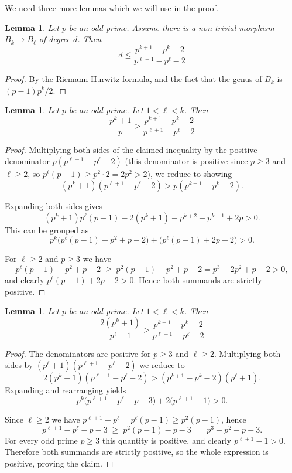 \documentclass[oneside,a4paper,12pt]{article}
\theoremstyle{plain} %
\newtheorem{lemma}[theorem]{Lemma}
\theoremstyle{definition} %
\begin{document}
We need three more lemmas which we will use in the proof.


\begin{lemma}\label{rh_ineq}
Let $p$ be an odd prime. Assume there is a 
 non-trivial morphism  $B_{k} \longrightarrow B_{\ell}$ of degree $d$.
Then 
$$ d\leq \frac{p^{k+1}-p^k-2}{ p^{\ell+1}-p^\ell-2} $$
\end{lemma}

\begin{proof}
By the Riemann-Hurwitz formula, and the fact that the genus
of $B_k$ is $(p-1)p^k/2$.
\end{proof}


\begin{lemma}\label{kl_ineq}
Let $p$ be an odd prime. Let $1<\ell <k$.
Then 
$$\frac{p^k+1}{p} > \frac{p^{k+1}-p^k-2}{ p^{\ell+1}-p^\ell-2} $$
\end{lemma}

\begin{proof}
Multiplying both sides of the claimed inequality by the positive denominator 
\(p(p^{\ell+1}-p^\ell-2)\) (this denominator is positive since \(p\ge 3\) and \(\ell\ge 2\), 
so \(p^\ell(p-1)\ge p^2\cdot 2 = 2p^2 > 2\)), we reduce to showing
\[
(p^k+1)(p^{\ell+1}-p^\ell-2) > p(p^{k+1}-p^k-2).
\]

Expanding both sides gives
\[
(p^k+1)p^\ell(p-1)-2(p^k+1) - p^{k+2}+p^{k+1}+2p>0.
\]
This can be grouped as
\[
p^k\big(p^\ell(p-1)-p^2+p-2\big) + \big(p^\ell(p-1)+2p-2\big)>0.
\]

For \(\ell\ge 2\) and \(p\ge 3\) we have
\[
p^\ell(p-1)-p^2+p-2 \;\ge\; p^2(p-1)-p^2+p-2 = p^3-2 p^2+p-2 >0,
\]
and clearly \(p^\ell(p-1)+2p-2 >0\). Hence both summands are strictly positive.
\end{proof}



\begin{lemma}\label{kl_ineq_2}
Let $p$ be an odd prime. Let $1<\ell <k$.
Then 
$$\frac{2(p^k+1)}{p^\ell+1} > \frac{p^{k+1}-p^k-2}{ p^{\ell+1}-p^\ell-2} $$
\end{lemma}

\begin{proof}
The denominators are positive for \(p\ge3\) and \(\ell\ge2\). Multiplying both sides by 
\((p^\ell+1)(p^{\ell+1}-p^\ell-2)\) we reduce to
\[
2(p^k+1)(p^{\ell+1}-p^\ell-2)>(p^{k+1}-p^k-2)(p^\ell+1).
\]
Expanding and rearranging yields
\[
p^k\big(p^{\ell+1}-p^\ell-p-3\big)+2\big(p^{\ell+1}-1\big)>0.
\]




Since \(\ell\ge2\) we have \(p^{\ell+1}-p^\ell=p^\ell(p-1)\ge p^2(p-1)\), hence
\[
p^{\ell+1}-p^\ell-p-3 \;\ge\; p^2(p-1)-p-3 \;=\; p^3-p^2-p-3.
\]
For every odd prime \(p\ge3\) this quantity is positive, and clearly 
\(p^{\ell+1}-1>0\). Therefore both summands are strictly positive, so the 
whole expression is positive, proving the claim.
\end{proof}
\end{document}
